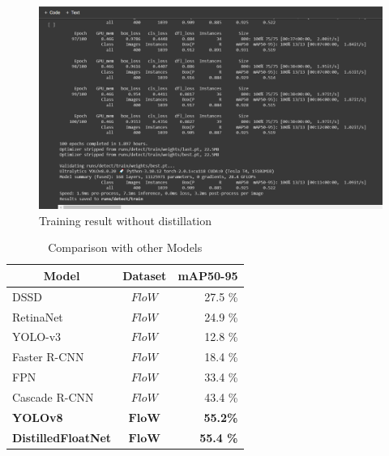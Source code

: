 \begin{enumerate}
\vspace{\baselineskip}
\vspace{\baselineskip}


\begin{figure}[H]
\centering
	\includegraphics*[width = 14cm]{images/training-result-without-distillation.png}
	 \caption{Training result without distillation}
	\label{fig:t}
\end{figure}

\begin{table}[H]
    \centering
    \label{table:training-2}
\begin{tabular}{lcr}
\hline \multicolumn{1}{c}{Model} & Dataset & mAP50-95\\
\hline 
DSSD & $FloW$ & 27.5 \%\\
RetinaNet & $FloW$  & 24.9 \% \\
YOLO-v3 & $FloW $ & 12.8 \% \\
Faster R-CNN & $FloW $ & 18.4 \% \\
FPN & $FloW $ & 33.4 \% \\
Cascade R-CNN & $FloW $ & 43.4 \% \\
\textbf{YOLOv8} & $\textbf{FloW} $ & \textbf{55.2\%}\\
\textbf{DistilledFloatNet} & $\textbf{FloW}$ & \textbf{55.4 \% }\\
\hline
\end{tabular}
\caption{Comparison with other Models}
\end{table}


\end{enumerate}
